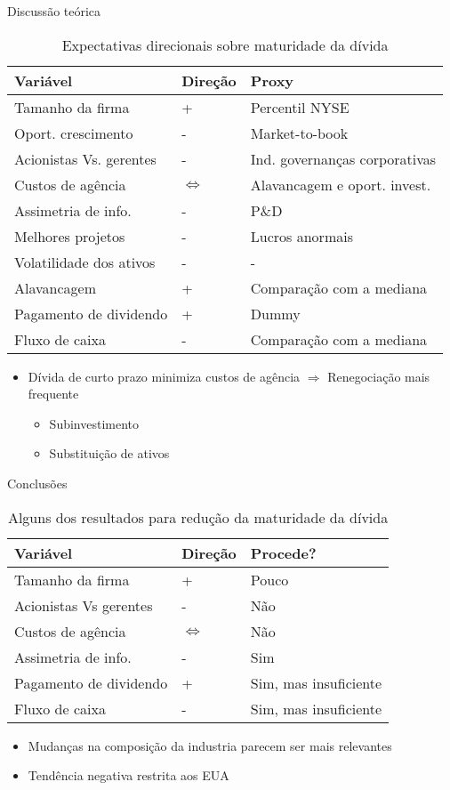 \documentclass[presentation]{beamer}
\begin{document}
\begin{frame}[label={sec:org2c64df9}]{Discussão teórica}
\begin{table}[htbp]
\caption{Expectativas direcionais sobre maturidade da dívida}
\centering
\begin{tabular}{lll}
\hline
Variável & Direção & Proxy\\
\hline
Tamanho da firma & + & Percentil NYSE\\
Oport. crescimento & - & Market-to-book\\
Acionistas Vs. gerentes & - & Ind. governanças corporativas\\
Custos de agência & \(\Leftrightarrow\) & Alavancagem e oport. invest.\\
Assimetria de info. & - & P\&D\\
Melhores projetos & - & Lucros anormais\\
Volatilidade dos ativos & - & -\\
Alavancagem & + & Comparação com a mediana\\
Pagamento de dividendo & + & Dummy\\
Fluxo de caixa & - & Comparação com a mediana\\
\hline
\end{tabular}
\end{table}


\begin{itemize}
\item Dívida de curto prazo minimiza custos de agência \(\Rightarrow\) Renegociação mais frequente
\begin{itemize}
\item Subinvestimento
\item Substituição de ativos
\end{itemize}
\end{itemize}
\end{frame}

\begin{frame}[label={sec:orgb0891b0}]{Conclusões}
\begin{table}[htbp]
\caption{Alguns dos resultados para redução da maturidade da dívida}
\centering
\begin{tabular}{lll}
\hline
Variável & Direção & Procede?\\
\hline
Tamanho da firma & + & Pouco\\
Acionistas Vs gerentes & - & Não\\
Custos de agência & \(\Leftrightarrow\) & Não\\
Assimetria de info. & - & Sim\\
Pagamento de dividendo & + & Sim, mas insuficiente\\
Fluxo de caixa & - & Sim, mas insuficiente\\
\hline
\end{tabular}
\end{table}


\begin{itemize}
\item Mudanças na composição da industria parecem ser mais relevantes
\item Tendência negativa restrita aos EUA
\end{itemize}
\end{frame}
\end{document}
